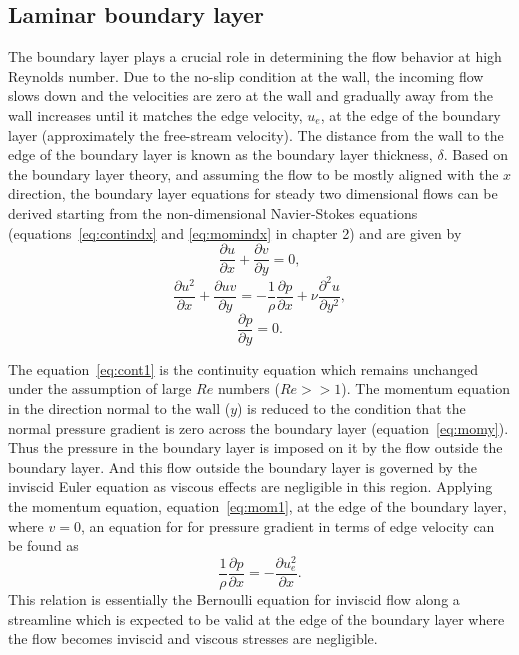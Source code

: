 \subsection{Laminar boundary layer}\label{ssec:lambl}
The boundary layer plays a crucial role in determining the flow behavior at high Reynolds number. Due to the no-slip condition at the wall, the incoming flow slows down and the velocities are zero at the wall and gradually away from the wall increases until it matches the edge velocity, $u_e$, at the edge of the boundary layer (approximately the free-stream velocity). The distance from the wall to the edge of the boundary layer is  known as the boundary layer thickness, $\delta$. Based on the boundary layer theory, and assuming the flow to be mostly aligned with the $x$ direction, the boundary layer equations for steady two dimensional flows can be derived starting from the non-dimensional Navier-Stokes equations (equations~\ref{eq:contindx} and \ref{eq:momindx} in chapter 2) and are given by
\begin{equation}
\frac{\partial u}{\partial x} + \frac{\partial v}{\partial y} = 0,
\label{eq:cont1}
\end{equation}
\begin{equation}
\frac{\partial u^2}{\partial x} + \frac{\partial uv}{\partial y} = -\frac{1}{\rho}\frac{\partial p}{\partial x} + \nu\frac{\partial^2 u}{\partial y^2}, 
\label{eq:mom1}
\end{equation}
\begin{equation}
\frac{\partial p}{\partial y} = 0.
\label{eq:momy}
\end{equation}

The equation~\ref{eq:cont1} is the continuity equation which remains unchanged under the assumption of large $Re$ numbers ($Re >> 1$). The momentum equation in the direction normal to the wall ($y$) is reduced to the condition that the normal pressure gradient is zero across the boundary layer (equation~\ref{eq:momy}). Thus the pressure in the boundary layer is imposed on it by the flow outside the boundary layer. And this flow outside the boundary layer is governed by the inviscid Euler equation as viscous effects are negligible in this region. Applying the momentum equation, equation~\ref{eq:mom1}, at the edge of the boundary layer, where $v=0$, an equation for for pressure gradient in terms of edge velocity can be found as
\begin{equation}
\frac{1}{\rho}\frac{\partial p}{\partial x} = -\frac{\partial u_e^2}{\partial x}.
\label{eq:ueprel}
\end{equation}
This relation is essentially the Bernoulli equation for inviscid flow along a streamline which is expected to be valid at the edge of the boundary layer where the flow becomes inviscid and viscous stresses are negligible. 

